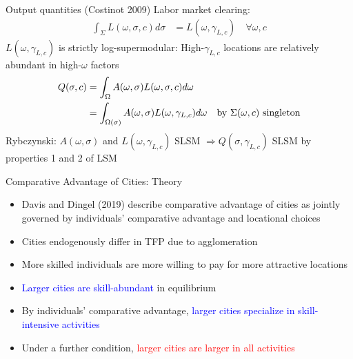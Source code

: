 \documentclass[10pt,notes=hide]{beamer}
\begin{document}
\begin{frame}{Output quantities (Costinot 2009)}
Labor market clearing:
\begin{align*}
\int_{\Sigma} L(\omega,\sigma,c)d\sigma &= L(\omega,\gamma_{L,c}) \quad \forall \omega,c
\end{align*}
$L(\omega,\gamma_{L,c})$ is strictly log-supermodular: High-$\gamma_{L,c}$ locations are relatively abundant in high-$\omega$ factors
		\begin{align*}
		Q(\sigma,c) & = \int_{\Omega} A(\omega,\sigma)L(\omega,\sigma,c)d\omega \\
		 & = \int_{\Omega(\sigma)} A(\omega,\sigma)L(\omega,\gamma_{L,c})d\omega &\textnormal{by $\Sigma(\omega,c)$ singleton}
		\end{align*}
Rybczynski: $A(\omega,\sigma)$ and $L(\omega,\gamma_{L,c})$ SLSM $\Rightarrow Q(\sigma,\gamma_{L,c})$ SLSM by properties 1 and 2 of LSM
\end{frame}
\begin{frame}{Comparative Advantage of Cities: Theory}
\begin{itemize}
\item Davis and Dingel (2019) describe comparative advantage of cities as jointly governed by
individuals' comparative advantage and locational choices
\item Cities endogenously differ in TFP due to agglomeration
\item More skilled individuals are more willing to pay for more attractive
locations
\item \textcolor{blue}{Larger cities are skill-abundant} in equilibrium
\item By individuals' comparative advantage, \textcolor{blue}{larger cities
specialize in skill-intensive activities}
\item Under a further condition, \textcolor{red}{larger cities are larger
in all activities}
\end{itemize}
\end{frame}
\end{document}
